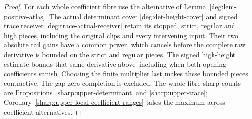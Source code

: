 \begin{proof}
For each whole coefficient fibre use the alternative of
Lemma~\ref{deg:lem-positive-atlas}. The actual determinant cover
\eqref{deg:det-height-cover} and signed trace receiver
\eqref{deg:trace-actual-receiver} retain its stopped, strict, regular
and high pieces, including the original clips and every intervening
input. Their two absolute tail gains have a common power, which cancels
before the complete raw derivative is bounded on the strict and regular
pieces. The signed high-height estimate bounds that same derivative
above, including when both opening coefficients vanish. Choosing the
finite multiplier last makes these bounded pieces contractive.
The gap-zero completion is excluded. The whole-fibre sharp counts are
Propositions~\ref{sharp:upper-determinant} and \ref{sharp:upper-trace};
Corollary~\ref{sharp:upper-local-coefficient-ranges} takes the maximum
across coefficient alternatives.
\end{proof}
